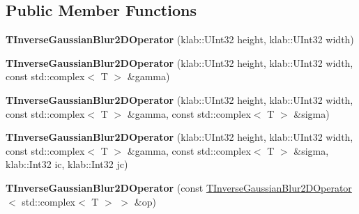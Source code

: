 \subsection*{Public Member Functions}
\begin{DoxyCompactItemize}
\item 
{\bfseries T\+Inverse\+Gaussian\+Blur2\+D\+Operator} (klab\+::\+U\+Int32 height, klab\+::\+U\+Int32 width)\hypertarget{classkl1p_1_1TInverseGaussianBlur2DOperator_3_01std_1_1complex_3_01T_01_4_01_4_a1eaf42573bc86105f7588c3d808ad41a}{}\label{classkl1p_1_1TInverseGaussianBlur2DOperator_3_01std_1_1complex_3_01T_01_4_01_4_a1eaf42573bc86105f7588c3d808ad41a}

\item 
{\bfseries T\+Inverse\+Gaussian\+Blur2\+D\+Operator} (klab\+::\+U\+Int32 height, klab\+::\+U\+Int32 width, const std\+::complex$<$ T $>$ \&gamma)\hypertarget{classkl1p_1_1TInverseGaussianBlur2DOperator_3_01std_1_1complex_3_01T_01_4_01_4_afb1b6f9bc81dddc039ddd9d175d14617}{}\label{classkl1p_1_1TInverseGaussianBlur2DOperator_3_01std_1_1complex_3_01T_01_4_01_4_afb1b6f9bc81dddc039ddd9d175d14617}

\item 
{\bfseries T\+Inverse\+Gaussian\+Blur2\+D\+Operator} (klab\+::\+U\+Int32 height, klab\+::\+U\+Int32 width, const std\+::complex$<$ T $>$ \&gamma, const std\+::complex$<$ T $>$ \&sigma)\hypertarget{classkl1p_1_1TInverseGaussianBlur2DOperator_3_01std_1_1complex_3_01T_01_4_01_4_a9b5645ed94cb2dc87b69bcb2c27106cb}{}\label{classkl1p_1_1TInverseGaussianBlur2DOperator_3_01std_1_1complex_3_01T_01_4_01_4_a9b5645ed94cb2dc87b69bcb2c27106cb}

\item 
{\bfseries T\+Inverse\+Gaussian\+Blur2\+D\+Operator} (klab\+::\+U\+Int32 height, klab\+::\+U\+Int32 width, const std\+::complex$<$ T $>$ \&gamma, const std\+::complex$<$ T $>$ \&sigma, klab\+::\+Int32 ic, klab\+::\+Int32 jc)\hypertarget{classkl1p_1_1TInverseGaussianBlur2DOperator_3_01std_1_1complex_3_01T_01_4_01_4_ac43ef7f10ca2734b690bb186c9101982}{}\label{classkl1p_1_1TInverseGaussianBlur2DOperator_3_01std_1_1complex_3_01T_01_4_01_4_ac43ef7f10ca2734b690bb186c9101982}

\item 
{\bfseries T\+Inverse\+Gaussian\+Blur2\+D\+Operator} (const \hyperlink{classkl1p_1_1TInverseGaussianBlur2DOperator}{T\+Inverse\+Gaussian\+Blur2\+D\+Operator}$<$ std\+::complex$<$ T $>$ $>$ \&op)\hypertarget{classkl1p_1_1TInverseGaussianBlur2DOperator_3_01std_1_1complex_3_01T_01_4_01_4_ab624d5ccbfd2a7e8d88d382f246f737e}{}\label{classkl1p_1_1TInverseGaussianBlur2DOperator_3_01std_1_1complex_3_01T_01_4_01_4_ab624d5ccbfd2a7e8d88d382f246f737e}


\end{DoxyCompactItemize}
